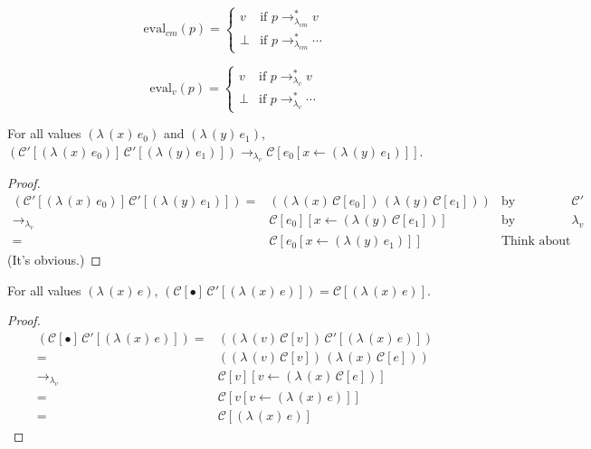 \documentclass[ms,electronic,twosidetoc,letterpaper,chaptercenter,parttop]{byumsphd}
\newcommand{\lv}{$\lambda_v$}
\newcommand{\lvrr}{\rightarrow_{\lambda_v}}
\newcommand{\lvrrs}{\rightarrow_{\lambda_v}^{*}}
\newcommand{\cmrrs}{\rightarrow_{\lambda_{cm}}^{*}}
\newcommand{\C}[1]{\mathcal{C}[#1]}
\newcommand{\Cp}[1]{\mathcal{C}'[#1]}
\newcommand{\abs}[2]{(\lambda\,(#1)\,#2)}
\newcommand{\app}[2]{(#1\,#2)}
\newcommand{\hole}{\bullet}
\begin{document}
\begin{defn}
\[
\mathrm{eval}_{cm}(p)=\begin{cases}
v     &\text{if $p\cmrrs v$}\\
\perp &\text{if $p\cmrrs\cdots$}
\end{cases}
\]
\end{defn}

\begin{defn}
\[
\mathrm{eval}_{v}(p)=\begin{cases}
v     &\text{if $p\lvrrs v$}\\
\perp &\text{if $p\lvrrs\cdots$}
\end{cases}
\]
\end{defn}

\begin{lemma}
\label{cm-app}
For all values $\abs{x}{e_0}$ and $\abs{y}{e_1}$, $\app{\Cp{\abs{x}{e_0}}}{\Cp{\abs{y}{e_1}}}\lvrr\C{e_0[x\leftarrow \abs{y}{e_1}]}$.
\end{lemma}

\begin{proof}
\begin{align*}
\app{\Cp{\abs{x}{e_0}}}{\Cp{\abs{y}{e_1}}} = &\app{\abs{x}{\C{e_0}}}{\abs{y}{\C{e_1}}}&\text{by definition of $\mathcal{C}'$}\\
                                       \lvrr &\C{e_0}[x\leftarrow \abs{y}{\C{e_1}}]&\text{by semantics of \lv}\\
                                           = &\C{e_0[x\leftarrow \abs{y}{e_1}}]&\text{Think about it.}
\end{align*}
(It's obvious.)
\end{proof}

\begin{lemma}
\label{hole-context-to-value}
For all values $\abs{x}{e}$, $\app{\C{\hole}}{\Cp{\abs{x}{e}}}=\C{\abs{x}{e}}$.
\end{lemma}

\begin{proof}
\begin{align*}
\app{\C{\hole}}{\Cp{\abs{x}{e}}} = &\app{\abs{v}{\C{v}}}{\Cp{\abs{x}{e}}}\\
                                 = &\app{\abs{v}{\C{v}}}{\abs{x}{\C{e}}}\\
                             \lvrr &\C{v}[v\leftarrow \abs{x}{\C{e}}]\\
                                 = &\C{v[v\leftarrow \abs{x}{e}]}\\
                                 = &\C{\abs{x}{e}}
\end{align*}
\end{proof}
\end{document}
